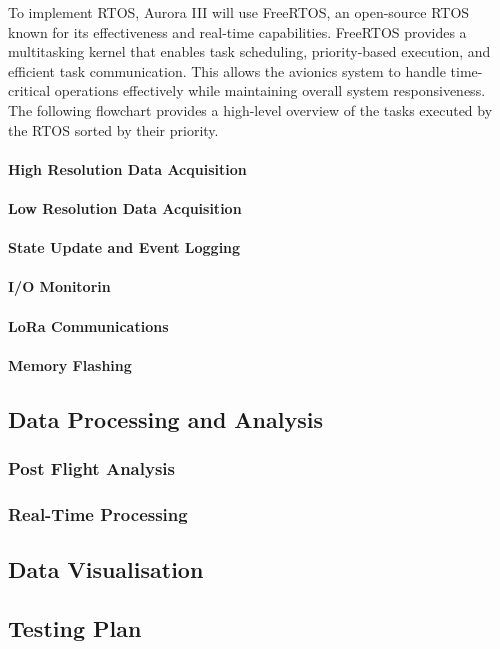 To implement RTOS, Aurora III will use FreeRTOS, an open-source RTOS known for its effectiveness and real-time capabilities. FreeRTOS provides a multitasking kernel that enables task scheduling, priority-based execution, and efficient task communication. This allows the avionics system to handle time-critical operations effectively while maintaining overall system responsiveness. The following flowchart provides a high-level overview of the tasks executed by the RTOS sorted by their priority. 

\paragraph{High Resolution Data Acquisition}
\paragraph{Low Resolution Data Acquisition}
\paragraph{State Update and Event Logging}
\paragraph{I/O Monitorin}
\paragraph{LoRa Communications}
\paragraph{Memory Flashing}

\subsection{Data Processing and Analysis}
\subsubsection{Post Flight Analysis}
\subsubsection{Real-Time Processing}

\subsection{Data Visualisation}
\subsection{Testing Plan}
